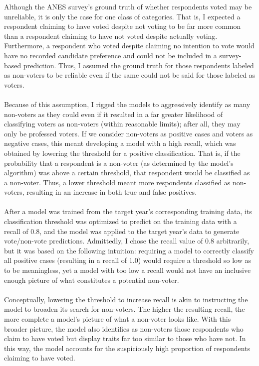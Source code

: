 \documentclass{article}
\begin{document}
	Although the ANES survey's ground truth of whether respondents voted may be unreliable, it is only the case for one class of categories. That is, I expected a respondent claiming to have voted despite not voting to be far more common than a respondent claiming to have not voted despite actually voting. Furthermore, a respondent who voted despite claiming no intention to vote would have no recorded candidate preference and could not be included in a survey-based prediction. Thus, I assumed the ground truth for those respondents labeled as non-voters to be reliable even if the same could not be said for those labeled as voters.
	\\\\
	Because of this assumption, I rigged the models to aggressively identify as many non-voters as they could even if it resulted in a far greater likelihood of classifying voters as non-voters (within reasonable limits); after all, they may only be professed voters. If we consider non-voters as positive cases and voters as negative cases, this meant developing a model with a high recall, which was obtained by lowering the threshold for a positive classification. That is, if the probability that a respondent is a non-voter (as determined by the model's algorithm) was above a certain threshold, that respondent would be classified as a non-voter. Thus, a lower threshold meant more respondents classified as non-voters, resulting in an increase in both true and false positives.
	\\\\
	After a model was trained from the target year's corresponding training data, its classification threshold was optimized to predict on the training data with a recall of 0.8, and the model was applied to the target year's data to generate vote/non-vote predictions. Admittedly, I chose the recall value of 0.8 arbitrarily, but it was based on the following intuition: requiring a model to correctly classify all positive cases (resulting in a recall of 1.0) would require a threshold so low as to be meaningless, yet a model with too low a recall would not have an inclusive enough picture of what constitutes a potential non-voter.
	\\\\
	Conceptually, lowering the threshold to increase recall is akin to instructing the model to broaden its search for non-voters. The higher the resulting recall, the more complete a model's picture of what a non-voter looks like. With this broader picture, the model also identifies as non-voters those respondents who claim to have voted but display traits far too similar to those who have not. In this way, the model accounts for the suspiciously high proportion of respondents claiming to have voted.
	
\end{document}
